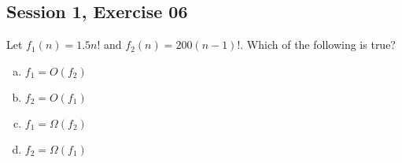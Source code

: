 \subsection{Session 1, Exercise 06}


Let $f_1(n) = 1.5n!$ and $f_2(n)=200(n-1)!$. Which of the following is true?

\begin{enumerate}[a.)]
    \item $f_1=O(f_2)$
    \item $f_2=O(f_1)$
    \item $f_1=\Omega(f_2)$
    \item $f_2=\Omega(f_1)$
\end{enumerate}

